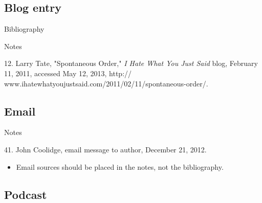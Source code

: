 \subsection{Blog entry}

\begin{center}{Bibliography}\end{center}

\begin{singlespace}
\noindent{}
\end{singlespace}

\begin{center}{Notes}\end{center} 

\begin{singlespace}
\noindent\hspace{1.2cm}12. Larry Tate, "Spontaneous
Order," \emph{I Hate What You Just Said} blog, February 11, 2011, accessed May
12, 2013, http://\\www.ihatewhatyoujustsaid.com/2011/02/11/spontaneous-order/.
\end{singlespace}


\subsection{Email}

\begin{center}{Notes}\end{center} 
\begin{singlespace}
\noindent\hspace{1.2cm}41. John Coolidge, email message
to author, December 21, 2012.
\end{singlespace}

\begin{itemize}\item Email sources should be placed in the notes, not the
bibliography.\end{itemize} %

\subsection{Podcast}

